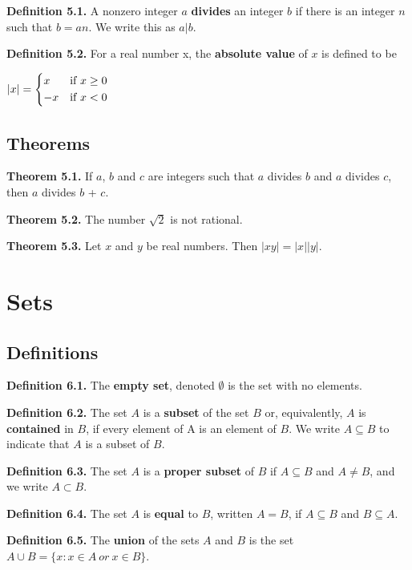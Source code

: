 \documentclass{article}
\begin{document}
\textbf{Definition 5.1.} A nonzero integer $a$ \textbf{divides} an integer $b$ if there is an integer $n$ such that $b = an$. We write this as $a|b$.

\textbf{Definition 5.2.} For a real number x, the \textbf{absolute value} of $x$ is defined to be

\begin{center}
	\begin{math}
		|x| =
			\begin{cases*}
				 x & if $x \geq 0$ \\
				-x & if $x < 0$
			\end{cases*}
	\end{math}
\end{center}

\subsection{Theorems}
\textbf{Theorem 5.1.} If $a$, $b$ and $c$ are integers such that $a$ divides $b$ and $a$ divides $c$, then $a$ divides $b$ + $c$.

\textbf{Theorem 5.2.} The number $\sqrt{2}$ is not rational.

\textbf{Theorem 5.3.} Let $x$ and $y$ be real numbers. Then $|xy| = |x||y|$.


\pagebreak
\section{Sets}
\subsection{Definitions}
\textbf{Definition 6.1.} The \textbf{empty set}, denoted $\emptyset$ is the set with no elements.

\textbf{Definition 6.2.} The set $A$ is a \textbf{subset} of the set $B$ or, equivalently, $A$ is \textbf{contained} in $B$, if every element of A is an element of $B$. We write $A \subseteq B$ to indicate that $A$ is a subset of $B$. 

\textbf{Definition 6.3.} The set $A$ is a \textbf{proper subset} of $B$ if $A \subseteq B$ and $A \neq B$, and we write $A \subset B$.

\textbf{Definition 6.4.} The set $A$ is \textbf{equal} to $B$, written $A = B$, if $A \subseteq B$ and $B \subseteq A$.

\textbf{Definition 6.5.} The \textbf{union} of the sets $A$ and $B$ is the set 
	$A \cup B = \{x : x \in A\ or\ x \in B \}$.
	
\end{document}
